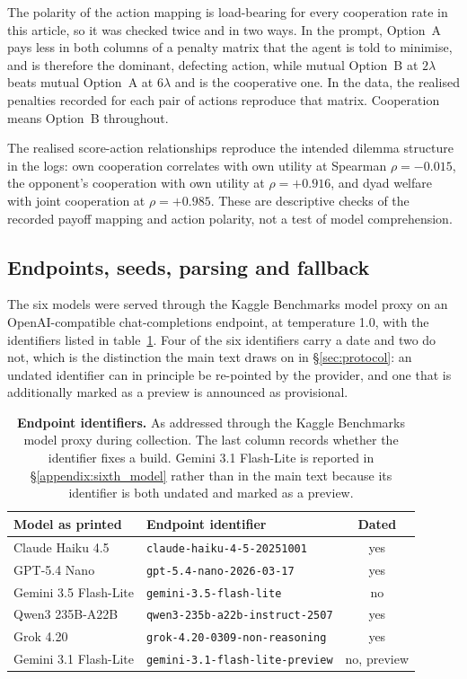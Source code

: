 \documentclass[openacc]{rsproca_new}
\newcommand{\lam}{\lambda}
\begin{document}
The polarity of the action mapping is load-bearing for every cooperation rate
in this article, so it was checked twice and in two ways. In the prompt,
Option~A pays less in both columns of a penalty matrix that the agent is told
to minimise, and is therefore the dominant, defecting action, while mutual
Option~B at $2\lam$ beats mutual Option~A at $6\lam$ and is the cooperative
one. In the data, the realised penalties recorded for each pair of actions
reproduce that matrix. Cooperation means Option~B throughout.

The realised score-action relationships reproduce the intended dilemma
structure in the logs: own cooperation correlates with own utility at Spearman
$\rho = -0.015$, the opponent's cooperation with own utility at $\rho = +0.916$,
and dyad welfare with joint cooperation at $\rho = +0.985$. These are
descriptive checks of the recorded payoff mapping and action polarity, not a
test of model comprehension.

\subsection{Endpoints, seeds, parsing and fallback}\label{appendix:endpoints}

The six models were served through the Kaggle Benchmarks model proxy on an
OpenAI-compatible chat-completions endpoint, at temperature 1.0, with the
identifiers listed in table~\ref{tab:A-endpoints}. Four of the six identifiers
carry a date and two do not, which is the distinction the main text draws on in
\S\ref{sec:protocol}: an undated identifier can in principle be re-pointed by
the provider, and one that is additionally marked as a preview is announced as
provisional.

\begin{table}[htbp]
\centering
\footnotesize
\caption{\textbf{Endpoint identifiers.} As addressed through the Kaggle
Benchmarks model proxy during collection. The last column records whether the
identifier fixes a build. Gemini 3.1 Flash-Lite is reported in
\S\ref{appendix:sixth_model} rather than in the main text because its
identifier is both undated and marked as a preview.}
\label{tab:A-endpoints}
\begin{tabular}{@{}llc@{}}
\toprule
Model as printed & Endpoint identifier & Dated \\
\midrule
Claude Haiku 4.5      & \texttt{claude-haiku-4-5-20251001}      & yes \\
GPT-5.4 Nano          & \texttt{gpt-5.4-nano-2026-03-17}        & yes \\
Gemini 3.5 Flash-Lite & \texttt{gemini-3.5-flash-lite}          & no  \\
Qwen3 235B-A22B       & \texttt{qwen3-235b-a22b-instruct-2507}  & yes \\
Grok 4.20             & \texttt{grok-4.20-0309-non-reasoning}   & yes \\
Gemini 3.1 Flash-Lite & \texttt{gemini-3.1-flash-lite-preview}  & no, preview \\
\bottomrule
\end{tabular}
\end{table}
\end{document}
